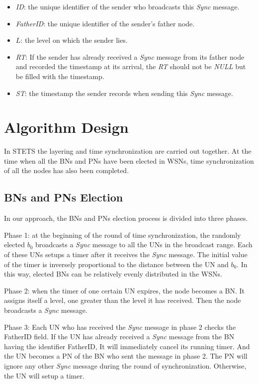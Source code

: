 \documentclass[runningheads,a4paper]{llncs}
\begin{document}
\begin{itemize}
\item \textit{ID}: the unique identifier of the sender who broadcasts this \textit{Sync} message.
\item \textit{FatherID}: the unique identifier of the sender's father node.
\item $ L$: the level on which the sender lies.
\item \textit{RT}: If the sender has already received a \textit{Sync} message from its father node and recorded the timestamp at its arrival, the \textit{RT} should not be \textit{NULL} but be filled with the timestamp.
\item \textit{ST}: the timestamp the sender records when sending this \textit{Sync} message.
\end{itemize}


\section{Algorithm Design}
\label{sec:algorithm}

In STETS the layering and time synchronization are carried out together. At the time when all the BNs and PNs have been elected in WSNs, time synchronization of all the nodes has also been completed.

\subsection{BNs and PNs Election}

In our approach, the BNs and PNs election process is divided into three
phases.

Phase 1: at the beginning of the round of time synchronization, the randomly elected $ b_{0}$ broadcasts a \textit{Sync} message to all the UNs in the broadcast range. Each of these UNs setups a timer after it receives the \textit{Sync} message. The initial value of the timer is inversely proportional to the distance between the UN and $b_{0}$. In this way, elected BNs can be relatively evenly distributed in the WSNs.

Phase 2: when the timer of one certain UN expires, the node becomes a BN. It assigns itself a level, one greater than the level it has received. Then the node broadcasts a \textit{Sync} message.


Phase 3: Each UN who has received the \textit{Sync} message in phase 2 checks the FatherID field. If the UN has already received a \textit{Sync} message from the BN having the identifier FatherID, It will immediately cancel its running timer. And the UN becomes a PN of the BN who sent the message in phase 2. The PN will ignore any other \textit{Sync} message during the round of synchronization. Otherwise, the UN will setup a timer.
\end{document}

